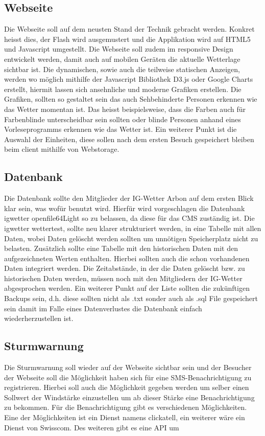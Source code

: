 \documentclass[a4paper,ngerman, 11pt, pagesize]{report}
\begin{document}
\subsection{Webseite}
Die Webseite soll auf dem neusten Stand der Technik gebracht werden. Konkret heisst dies, der Flash wird ausgemustert und die Applikation wird auf HTML5 und Javascript umgestellt. Die Webseite soll zudem im responsive Design entwickelt werden, damit auch auf mobilen Geräten die aktuelle Wetterlage sichtbar ist. Die dynamischen, sowie auch die teilweise statischen Anzeigen, werden wo möglich mithilfe der Javascript Bibliothek D3.js oder Google Charts erstellt, hiermit lassen sich ansehnliche und moderne Grafiken erstellen. Die Grafiken, sollten so gestaltet sein das auch Sehbehinderte Personen erkennen wie das Wetter momentan ist. Das heisst beispielsweise, dass die Farben auch für Farbenblinde unterscheidbar sein sollten oder blinde Personen anhand eines Vorleseprogramms erkennen wie das Wetter ist. Ein weiterer Punkt ist die Auswahl der Einheiten, diese sollen nach dem ersten Besuch gespeichert bleiben beim client mithilfe von Webstorage. 


\subsection{Datenbank}
Die Datenbank sollte den Mitglieder der IG-Wetter Arbon auf dem ersten Blick klar sein, was wofür benutzt wird. Hierfür wird vorgeschlagen die Datenbank igwetter openfile64Light so zu belassen, da diese für das CMS zuständig ist. Die igwetter wettertest, sollte neu klarer strukturiert werden, in eine Tabelle mit allen Daten, wobei Daten gelöscht werden sollten um unnötigen Speicherplatz nicht zu belasten. Zusätzlich sollte eine Tabelle mit den historischen Daten mit den aufgezeichneten Werten enthalten. Hierbei sollten auch die schon vorhandenen Daten integriert werden. Die Zeitabstände, in der die Daten gelöscht bzw. zu historischen Daten werden, müssen noch mit den Mitgliedern der IG-Wetter abgesprochen werden. Ein weiterer Punkt auf der Liste sollten die zukünftigen Backups sein, d.h. diese sollten nicht als .txt sonder auch als .sql File gespeichert sein damit im Falle eines Datenverlustes die Datenbank einfach wiederherzustellen ist.

\subsection{Sturmwarnung}
Die Sturmwarnung soll wieder auf der Webseite sichtbar sein und der Besucher der Webseite soll die Möglichkeit haben sich für eine SMS-Benachrichtigung zu registrieren. Hierbei soll auch die Möglichkeit gegeben werden um selber einen Sollwert der Windstärke einzustellen um ab dieser Stärke eine Benachrichtigung zu bekommen. Für die Benachrichtigung gibt es verschiedenen Möglichkeiten. Eine der Möglichkeiten ist ein Dienst namens clickatell, ein weiterer wäre ein Dienst von Swisscom. Des weiteren gibt es eine API um 
\end{document}
